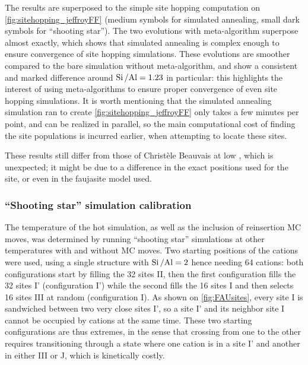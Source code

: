 \documentclass[main.tex]{subfiles}
\begin{document}
The results are superposed to the simple site hopping computation on \cref{fig:sitehopping_jeffroyFF} (medium symbols for simulated annealing, small dark symbols for ``shooting star''). The two evolutions with meta-algorithm superpose almost exactly, which shows that simulated annealing is complex enough to ensure convergence of site hopping simulations. These evolutions are smoother compared to the bare simulation without meta-algorithm, and show a consistent and marked difference around $\mbox{Si\,/Al} = 1.23$ in particular: this highlights the interest of using meta-algorithms to ensure proper convergence of even site hopping simulations. It is worth mentioning that the simulated annealing simulation ran to create \cref{fig:sitehopping_jeffroyFF} only takes a few minutes per point, and can be realized in parallel, so the main computational cost of finding the site populations is incurred earlier, when attempting to locate these sites.

These results still differ from those of Christèle Beauvais at low \SiAl, which is unexpected; it might be due to a difference in the exact positions used for the site, or even in the faujasite model used.

\subsubsection{``Shooting star'' simulation calibration}

The temperature of the hot simulation, as well as the inclusion of reinsertion MC moves, was determined by running ``shooting star'' simulations at other temperatures with and without MC moves. Two starting positions of the cations were used, using a single structure with $\mbox{Si\,/Al} = 2$ hence needing 64 cations: both configurations start by filling the 32 sites II, then the first configuration fills the 32 sites I' (configuration I') while the second fills the 16 sites I and then selects 16 sites III at random (configuration I). As shown on \cref{fig:FAUsites}, every site I is sandwiched between two very close sites I', so a site I' and its neighbor site I cannot be occupied by cations at the same time. These two starting configurations are thus extremes, in the sense that crossing from one to the other requires transitioning through a state where one cation is in a site I' and another in either III or J, which is kinetically costly.
\end{document}
